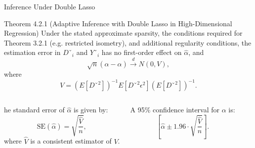 \documentclass[xcolor=svgnames,t]{beamer}
\begin{document}
            
            \begin{frame}{Inference Under Double Lasso}
            
                \begin{block}{Theorem 4.2.1 (Adaptive Inference with Double Lasso in High-Dimensional Regression)}
                Under the stated approximate sparsity, the conditions required for Theorem 3.2.1 (e.g. restricted isometry), and additional regularity conditions, the estimation error in \(Dˇ_i\) and \(Yˇ_i\) has no first-order effect on \(\widehat{\alpha}\), and
                \[
                \sqrt{n}(\widehat{\alpha} - \alpha) \xrightarrow{d} N(0, V),
                \]
                where
                \[
                V = \left(E[Dˇ^2]\right)^{-1} E[Dˇ^2 \epsilon^2] \left(E[Dˇ^2]\right)^{-1}.
                \]
                \end{block}
                
                \pause
                \scriptsize
                \begin{columns}[t]
                    \scriptsize
                    
                    he standard error of \(\widehat{\alpha}\) is given by:
                        \[
                        \text{SE}(\widehat{\alpha}) = \sqrt{\frac{\widehat{V}}{n}},
                        \]
                        where \(\widehat{V}\) is a consistent estimator of \(V\).
                
                    \pause
                
                    \scriptsize
                    A 95\% confidence interval for \(\alpha\) is: \\
                 
                        \[
                        \left[\widehat{\alpha} \pm 1.96 \cdot \sqrt{\frac{\widehat{V}}{n}} \right].
                        \]
               
                \end{columns}
            
                \end{frame}
                
            
            
\end{document}
